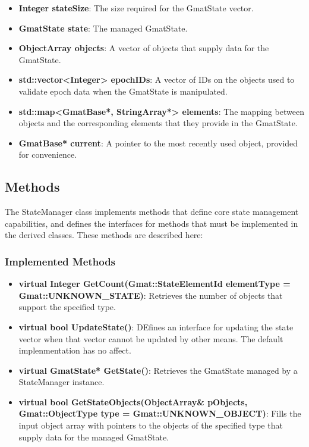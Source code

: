 \begin{itemize}
\item\textbf{Integer stateSize}:  The size required for the GmatState vector.
\item\textbf{GmatState state}:  The managed GmatState.
\item\textbf{ObjectArray objects}:  A vector of objects that supply data for the GmatState.
\item\textbf{std::vector<Integer> epochIDs}:  A vector of IDs on the objects used to validate epoch
data when the GmatState is manipulated.
\item\textbf{std::map<GmatBase*, StringArray*> elements}:  The mapping between objects and the
corresponding elements that they provide in the GmatState.
\item\textbf{GmatBase* current}:  A pointer to the most recently used object, provided for
convenience.
\end{itemize}

\subsection{Methods}

The StateManager class implements methods that define core state management capabilities, and
defines the interfaces for methods that must be implemented in the derived classes.  These methods
are described here:

\subsubsection{Implemented Methods}

\begin{itemize}
\item\textbf{virtual Integer GetCount(Gmat::StateElementId elementType = Gmat::UNKNOWN\_STATE)}:
Retrieves the number of objects that support the specified type.
\item\textbf{virtual bool UpdateState()}:  DEfines an interface for updating the state vector when
that vector cannot be updated by other means.  The default implenmentation has no affect.
\item\textbf{virtual GmatState* GetState()}:  Retrieves the GmatState managed by a StateManager
instance.
\item\textbf{virtual bool GetStateObjects(ObjectArray\& pObjects, Gmat::ObjectType type =
Gmat::UNKNOWN\_OBJECT)}:  Fills the input object array with pointers to the objects of the
specified type that supply data for the managed GmatState.
\end{itemize}

